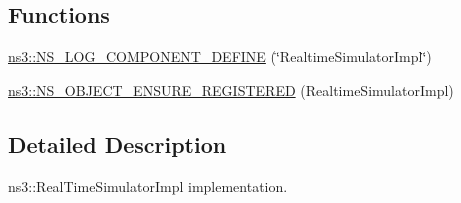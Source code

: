 \subsection*{Functions}
\begin{DoxyCompactItemize}
\item 
\hyperlink{namespacens3_ae96558378595e4656fa92b98d7d16fbd}{ns3\+::\+N\+S\+\_\+\+L\+O\+G\+\_\+\+C\+O\+M\+P\+O\+N\+E\+N\+T\+\_\+\+D\+E\+F\+I\+NE} (\char`\"{}Realtime\+Simulator\+Impl\char`\"{})
\item 
\hyperlink{namespacens3_ac9efb5ff9430f077ec5281bec163d628}{ns3\+::\+N\+S\+\_\+\+O\+B\+J\+E\+C\+T\+\_\+\+E\+N\+S\+U\+R\+E\+\_\+\+R\+E\+G\+I\+S\+T\+E\+R\+ED} (Realtime\+Simulator\+Impl)
\end{DoxyCompactItemize}


\subsection{Detailed Description}
ns3\+::\+Real\+Time\+Simulator\+Impl implementation. 